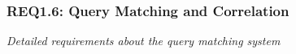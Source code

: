 \subsubsection{REQ1.6: Query Matching and Correlation}

\textit{Detailed requirements about the query matching system}
